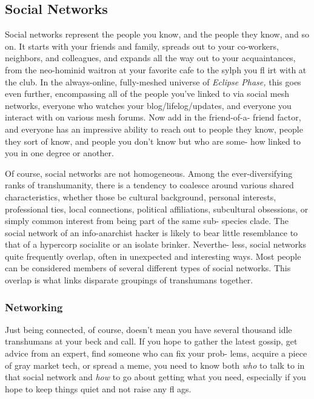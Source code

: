 \subsection{Social Networks}

Social networks represent the people you know, and 
the people they know, and so on. It starts with your 
friends and family, spreads out to your co-workers, 
neighbors, and colleagues, and expands all the way 
out to your acquaintances, from the neo-hominid 
waitron at your favorite cafe to the sylph you fl irt 
with at the club. In the always-online, fully-meshed 
universe of \textit{Eclipse Phase,} this goes even further, 
encompassing all of the people you've linked to via 
social mesh networks, everyone who watches your 
blog/lifelog/updates, and everyone you interact with 
on various mesh forums. Now add in the friend-of-a-
friend factor, and everyone has an impressive ability 
to reach out to people they know, people they sort of 
know, and people you don't know but who are some-
how linked to you in one degree or another.

Of course, social networks are not homogeneous. 
Among the ever-diversifying ranks of transhumanity, 
there is a tendency to coalesce around various shared 
characteristics, whether those be cultural background, 
personal interests, professional ties, local connections, 
political affiliations, subcultural obsessions, or simply 
common interest from being part of the same sub-
species clade. The social network of an info-anarchist 
hacker is likely to bear little resemblance to that of 
a hypercorp socialite or an isolate brinker. Neverthe-
less, social networks quite frequently overlap, often 
in unexpected and interesting ways. Most people can 
be considered members of several different types of 
social networks. This overlap is what links disparate 
groupings of transhumans together.

\subsubsection{Networking}

Just being connected, of course, doesn't mean you have 
several thousand idle transhumans at your beck and 
call. If you hope to gather the latest gossip, get advice 
from an expert, find someone who can fix your prob-
lems, acquire a piece of gray market tech, or spread a 
meme, you need to know both \textit{who} to talk to in that 
social network and \textit{how} to go about getting what you 
need, especially if you hope to keep things quiet and 
not raise any fl ags.

